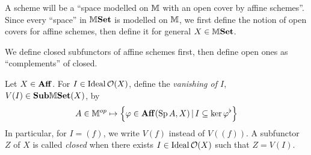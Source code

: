 \documentclass[../main.tex]{subfiles}
\begin{document}
\begin{rmk}
  A scheme will be a 
  ``space modelled on $\mathbb{M}$ with an open cover by affine schemes''.
  Since every ``space'' in $\mathbb{M}\mathbf{Set}$ is modelled on $\mathbb{M}$,
  we first define the notion of open covers for affine schemes,
  then define it for general $X \in \mathbb{M}\mathbf{Set}$.

  We define closed subfunctors of affine schemes first, 
  then define open ones as ``complements'' of closed.
\end{rmk}

\begin{dfn}

  Let $X \in \mathbf{Aff}$.
  For $I \in \operatorname{Ideal} \mathcal{O}(X)$, 
  define the \emph{vanishing of $I$}, $V(I) \in \mathbf{Sub}\mathbb{M}\mathbf{Set}(X)$, by 
  \[
    A \in \mathbb{M}^{op} \mapsto \left\{\varphi \in \mathbf{Aff}(\operatorname{Sp} A, X) \,|\, 
    I \subseteq \ker \varphi^\flat\right\}
  \] 
  In particular, for $I = (f)$,
  we write $V(f)$ instead of $V((f))$.
  A subfunctor $Z$ of $X$ is called \emph{closed} when 
  there exists $I \in \operatorname{Ideal} \mathcal{O}(X)$ such that $Z = V(I)$.
\end{dfn}
\end{document}
